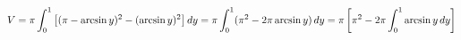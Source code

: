\documentclass[preview]{standalone}
\begin{document}
\begin{align*}
\special{dvisvgm:raw <g id='unique000'>}V=\pi\displaystyle\int_0^1\left[(\pi-\arcsin y)^2-(\arcsin y)^2\right]dy=\pi\int_0^1(\pi^2-2\pi\arcsin y)\,dy=\pi\left[\pi^2-2\pi\int_0^1\arcsin y\,dy\right]\special{dvisvgm:raw </g>}
\end{align*}
\end{document}
